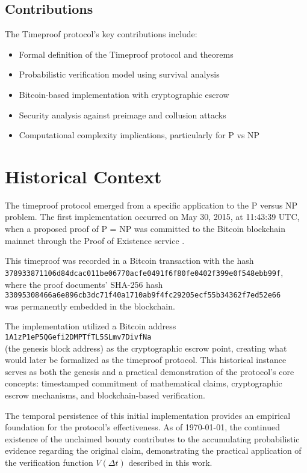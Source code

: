\documentclass[12pt]{report}
\begin{document}
\subsection{Contributions}
The Timeproof protocol's key contributions include:
\begin{itemize}
    \item Formal definition of the Timeproof protocol and theorems
    \item Probabilistic verification model using survival analysis
    \item Bitcoin-based implementation with cryptographic escrow
    \item Security analysis against preimage and collusion attacks
    \item Computational complexity implications, particularly for P vs NP
\end{itemize}

\section{Historical Context}

The timeproof protocol emerged from a specific application to the P versus NP problem. The first implementation occurred on May 30, 2015, at 11:43:39 UTC, when a proposed proof of P = NP was committed to the Bitcoin blockchain mainnet through the Proof of Existence service \cite{proofofexistence}.

This timeproof was recorded in a Bitcoin transaction with the hash\\
\texttt{378933871106d84dcac011be06770acfe0491f6f80fe0402f399e0f548ebb99f},\\
where the proof documents' SHA-256 hash\\
\texttt{33095308466a6e896cb3dc71f40a1710ab9f4fc29205ecf55b34362f7ed52e66}\\
was permanently embedded in the blockchain.

The implementation utilized a Bitcoin address\\
\texttt{1A1zP1eP5QGefi2DMPTfTL5SLmv7DivfNa}\\
(the genesis block address) as the cryptographic escrow point, creating what would later be formalized as the timeproof protocol. This historical instance serves as both the genesis and a practical demonstration of the protocol's core concepts: timestamped commitment of mathematical claims, cryptographic escrow mechanisms, and blockchain-based verification.

The temporal persistence of this initial implementation provides an empirical foundation for the protocol's effectiveness. As of \today, the continued existence of the unclaimed bounty contributes to the accumulating probabilistic evidence regarding the original claim, demonstrating the practical application of the verification function \( V(\Delta t) \) described in this work.
\end{document}
